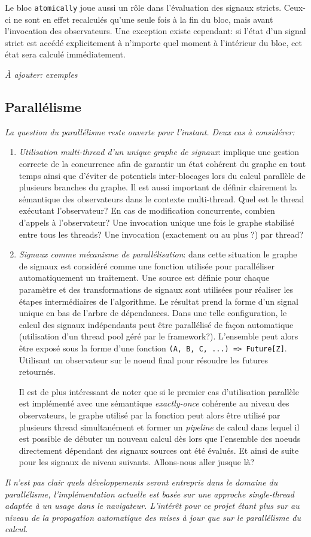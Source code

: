 Le bloc \texttt{atomically} joue aussi un rôle dans l'évaluation des signaux stricts. Ceux-ci ne sont en effet recalculés qu'une seule fois à la fin du bloc, mais avant l'invocation des observateurs. Une exception existe cependant: si l'état d'un signal strict est accédé explicitement à n'importe quel moment à l'intérieur du bloc, cet état sera calculé immédiatement.

\textit{À ajouter: exemples}


\subsection{Parallélisme}
\textit{La question du parallélisme reste ouverte pour l'instant. Deux cas à considérer:}
\begin{enumerate}
	\item \emph{Utilisation multi-thread d'un unique graphe de signaux}: implique une gestion correcte de la concurrence afin de garantir un état cohérent du graphe en tout temps ainsi que d'éviter de potentiels inter-blocages lors du calcul parallèle de plusieurs branches du graphe. Il est aussi important de définir clairement la sémantique des observateurs dans le contexte multi-thread. Quel est le thread exécutant l'observateur? En cas de modification concurrente, combien d'appels à l'observateur? Une invocation unique une fois le graphe stabilisé entre tous les threads? Une invocation (exactement ou au plus ?) par thread?
	\item \emph{Signaux comme mécanisme de parallélisation}: dans cette situation le graphe de signaux est considéré comme une fonction utilisée pour paralléliser automatiquement un traitement. Une source est définie pour chaque paramètre et des transformations de signaux sont utilisées pour réaliser les étapes intermédiaires de l'algorithme. Le résultat prend la forme d'un signal unique en bas de l'arbre de dépendances. Dans une telle configuration, le calcul des signaux indépendants peut être parallélisé de façon automatique (utilisation d'un thread pool géré par le framework?). L'ensemble peut alors être exposé sous la forme d'une fonction \texttt{(A, B, C, ...) => Future[Z]}. Utilisant un observateur sur le noeud final pour résoudre les futures retournés.
	
	Il est de plus intéressant de noter que si le premier cas d'utilisation parallèle est implémenté avec une sémantique \emph{exactly-once} cohérente au niveau des observateurs, le graphe utilisé par la fonction peut alors être utilisé par plusieurs thread simultanément et former un \emph{pipeline} de calcul dans lequel il est possible de débuter un nouveau calcul dès lors que l'ensemble des noeuds directement dépendant des signaux sources ont été évalués. Et ainsi de suite pour les signaux de niveau suivants. Allons-nous aller jusque là?
\end{enumerate}

\textit{Il n'est pas clair quels développements seront entrepris dans le domaine du parallélisme, l'implémentation actuelle est basée sur une approche single-thread adaptée à un usage dans le navigateur. L'intérêt pour ce projet étant plus sur au niveau de la propagation automatique des mises à jour que sur le parallélisme du calcul.}
